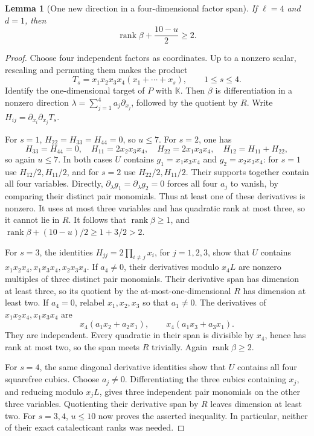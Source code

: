 \documentclass[11pt]{amsart}
\newtheorem{lemma}[theorem]{Lemma}
\theoremstyle{remark}
\numberwithin{equation}{section}
\newcommand{\K}{\mathbb K}
\newcommand{\rank}{\operatorname{rank}}
\newcommand{\dd}{\partial}
\begin{document}
\begin{lemma}[One new direction in a four-dimensional factor span]
\label{lem:four}
If \(\ell=4\) and \(d=1\), then
\[
 \rank\beta+\frac{10-u}{2}\ge2.
\]
\end{lemma}
\begin{proof}
Choose four independent factors as coordinates. Up to a nonzero scalar,
rescaling and permuting them makes the product
\[
 T_s=x_1x_2x_3x_4(x_1+\cdots+x_s),\qquad 1\le s\le4.
\]
Identify the one-dimensional target of \(P\) with \(\K\). Then
\(\beta\) is differentiation in a nonzero direction
\(\lambda=\sum_{j=1}^4a_j\dd_{x_j}\), followed by the quotient by \(R\).
Write \(H_{ij}=\dd_{x_i}\dd_{x_j}T_s\).

For \(s=1\), \(H_{22}=H_{33}=H_{44}=0\), so \(u\le7\).
For \(s=2\), one has
\[
 H_{33}=H_{44}=0,\quad
 H_{11}=2x_2x_3x_4,\quad H_{22}=2x_1x_3x_4,\quad
 H_{12}=H_{11}+H_{22},
\]
so again \(u\le7\). In both cases \(U\) contains
\(g_1=x_1x_3x_4\) and \(g_2=x_2x_3x_4\): for \(s=1\) use
\(H_{12}/2,H_{11}/2\), and for \(s=2\) use \(H_{22}/2,H_{11}/2\).
Their supports together contain all four variables. Directly,
\(\dd_\lambda g_1=\dd_\lambda g_2=0\) forces all four \(a_j\) to
vanish, by comparing their distinct pair monomials. Thus at least one
of these derivatives is nonzero. It uses at most three variables and
has quadratic rank at most three, so it cannot lie in \(R\).
It follows that \(\rank\beta\ge1\), and
\(\rank\beta+(10-u)/2\ge1+3/2>2\).

For \(s=3\), the identities
\(H_{jj}=2\prod_{i\ne j}x_i\), for \(j=1,2,3\), show that \(U\)
contains \(x_1x_2x_4,x_1x_3x_4,x_2x_3x_4\).
If \(a_4\ne0\), their derivatives modulo \(x_4L\) are nonzero
multiples of three distinct pair monomials. Their derivative span has
dimension at least three, so its quotient by the at-most-one-dimensional
\(R\) has dimension at least two. If \(a_4=0\), relabel
\(x_1,x_2,x_3\) so that \(a_1\ne0\). The derivatives of
\(x_1x_2x_4,x_1x_3x_4\) are
\[
 x_4(a_1x_2+a_2x_1),\qquad x_4(a_1x_3+a_3x_1).
\]
They are independent. Every quadratic in their span is divisible by
\(x_4\), hence has rank at most two, so the span meets \(R\) trivially.
Again \(\rank\beta\ge2\).

For \(s=4\), the same diagonal derivative identities show that \(U\)
contains all four squarefree cubics. Choose \(a_j\ne0\). Differentiating
the three cubics containing \(x_j\), and reducing modulo \(x_jL\),
gives three independent pair monomials on the other three variables.
Quotienting their derivative span by \(R\) leaves dimension at least two.
For \(s=3,4\), \(u\le10\) now proves the asserted inequality.
In particular, neither of their exact catalecticant ranks was needed.
\end{proof}
\end{document}
